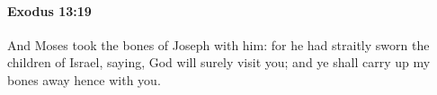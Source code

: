 
		\paragraph{Exodus 13:19} %
			\label{EXODUS-13-19}

			And Moses took the bones of Joseph with him: for he had straitly sworn the children of Israel, saying, God will surely visit you; and ye shall carry up my bones away hence with you.


